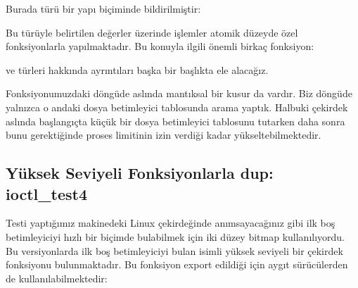 \documentclass[a4paper,10pt,turkish]{sphinxmanual}
\begin{document}
\sphinxAtStartPar
Burada  türü bir yapı biçiminde bildirilmiştir:

\begin{sphinxVerbatim}[commandchars=\\\{\}]
\end{sphinxVerbatim}

\sphinxAtStartPar
Bu  türüyle belirtilen değerler üzerinde işlemler atomik düzeyde özel
fonksiyonlarla yapılmaktadır. Bu konuyla ilgili önemli birkaç fonksiyon:

\begin{sphinxVerbatim}[commandchars=\\\{\}]
\end{sphinxVerbatim}

\sphinxAtStartPar
{} ve  türleri hakkında ayrıntıları başka bir başlıkta ele alacağız.

\sphinxAtStartPar
Fonksiyonumuzdaki döngüde aslında mantıksal bir kusur da vardır. Biz döngüde yalnızca o andaki
dosya betimleyici tablosunda arama yaptık. Halbuki çekirdek aslında başlangıçta küçük bir dosya
betimleyici tablosunu tutarken daha sonra bunu gerektiğinde proses limitinin izin verdiği kadar
yükseltebilmektedir.


\subsection{Yüksek Seviyeli Fonksiyonlarla dup: ioctl\_test4}
\label{\detokenize{filesystem1:yuksek-seviyeli-fonksiyonlarla-dup-ioctl-test4}}
\sphinxAtStartPar
Testi yaptığımız makinedeki Linux çekirdeğinde anımsayacağınız gibi ilk boş betimleyiciyi hızlı
bir biçimde bulabilmek için iki düzey bitmap kullanılıyordu. Bu versiyonlarda ilk boş
betimleyiciyi bulan  isimli yüksek seviyeli bir çekirdek fonksiyonu
bulunmaktadır. Bu fonksiyon export edildiği için aygıt sürücülerden de kullanılabilmektedir:
\end{document}
